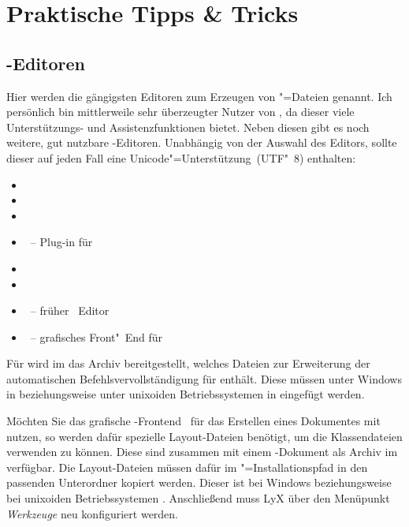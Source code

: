\newcommand*\TaT{\hyperref[sec:tips]{Tipps \& Tricks}:\xspace}
\chapter{Praktische Tipps \& Tricks}
%
\section{-Editoren}
%
%
Hier werden die gängigsten Editoren zum Erzeugen von "=Dateien 
genannt. Ich persönlich bin mittlerweile sehr überzeugter Nutzer von 
, da dieser viele Unterstützungs- und 
Assistenzfunktionen bietet. Neben diesen gibt es noch weitere, gut nutzbare 
-Editoren. Unabhängig von der Auswahl des Editors, sollte dieser 
auf jeden Fall eine Unicode"=Unterstützung~(UTF"~8) enthalten:
%
\begin{itemize}
\item {}
\item {}
\item {}
\item {}~-- Plug-in für 
\item {}
\item {}
\item {}~-- früher ~Editor
\item {}~-- grafisches Front"~End für 
\end{itemize}
%
Für  wird im \GitHubRepo* das Archiv 
bereitgestellt, welches Dateien zur Erweiterung der automatischen 
Befehlsvervollständigung für \TUDScript enthält. Diese müssen unter Windows in 
 beziehungsweise unter unixoiden 
Betriebssystemen in  eingefügt werden.

Möchten Sie das grafische -Frontend~ 
für das Erstellen eines Dokumentes mit \TUDScript nutzen, so werden dafür 
spezielle Layout-Dateien benötigt, um die Klassendateien verwenden zu können. 
Diese sind zusammen mit einem -Dokument als Archiv 
im \GitHubRepo* verfügbar. Die Layout-Dateien müssen dafür im 
"=Installationspfad in den passenden Unterordner 
kopiert werden. Dieser ist bei Windows
beziehungsweise bei unixoiden Betriebssystemen .
Anschließend muss LyX über den Menüpunkt \emph{Werkzeuge} neu konfiguriert 
werden. 



